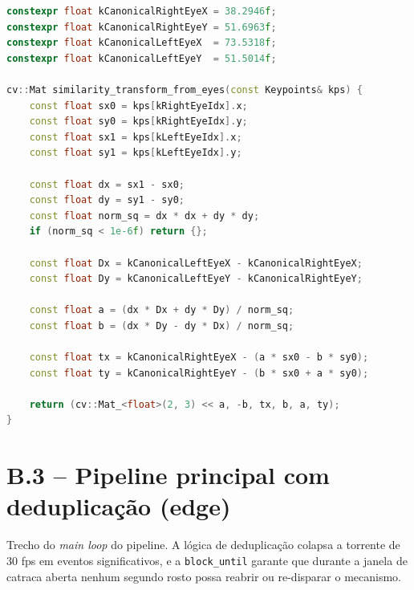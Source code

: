 \documentclass[12pt,a4paper]{report}
\begin{document}
\begin{lstlisting}[language=C++,caption={edge/src/vision/face\_embedder.cpp},label={lst:alignment}]
constexpr float kCanonicalRightEyeX = 38.2946f;
constexpr float kCanonicalRightEyeY = 51.6963f;
constexpr float kCanonicalLeftEyeX  = 73.5318f;
constexpr float kCanonicalLeftEyeY  = 51.5014f;

cv::Mat similarity_transform_from_eyes(const Keypoints& kps) {
    const float sx0 = kps[kRightEyeIdx].x;
    const float sy0 = kps[kRightEyeIdx].y;
    const float sx1 = kps[kLeftEyeIdx].x;
    const float sy1 = kps[kLeftEyeIdx].y;

    const float dx = sx1 - sx0;
    const float dy = sy1 - sy0;
    const float norm_sq = dx * dx + dy * dy;
    if (norm_sq < 1e-6f) return {};

    const float Dx = kCanonicalLeftEyeX - kCanonicalRightEyeX;
    const float Dy = kCanonicalLeftEyeY - kCanonicalRightEyeY;

    const float a = (dx * Dx + dy * Dy) / norm_sq;
    const float b = (dx * Dy - dy * Dx) / norm_sq;

    const float tx = kCanonicalRightEyeX - (a * sx0 - b * sy0);
    const float ty = kCanonicalRightEyeY - (b * sx0 + a * sy0);

    return (cv::Mat_<float>(2, 3) << a, -b, tx, b, a, ty);
}
\end{lstlisting}

\section*{B.3 -- Pipeline principal com deduplicação (edge)}

Trecho do \textit{main loop} do pipeline. A lógica de deduplicação
colapsa a torrente de 30 fps em eventos significativos, e a
\texttt{block\_until} garante que durante a janela de catraca
aberta nenhum segundo rosto possa reabrir ou re-disparar o
mecanismo.
\end{document}
